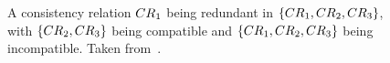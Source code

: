 \begin{figure}
    \centering
    
    \caption[Incompatibility with redundant consistency relation]{A consistency relation $\consistencyrelation{CR}{1}$ being redundant in  $\setted{\consistencyrelation{CR}{1}, \consistencyrelation{CR}{2}, \consistencyrelation{CR}{3}}$, with $\setted{\consistencyrelation{CR}{2}, \consistencyrelation{CR}{3}}$ being compatible and $\setted{\consistencyrelation{CR}{1}, \consistencyrelation{CR}{2},\consistencyrelation{CR}{3}}$ being incompatible. Taken from~.}
    \label{fig:compatibility:redundancy_compatibility_counterexample}
\end{figure}

